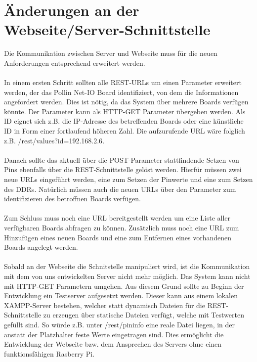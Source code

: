 \section{Änderungen an der Webseite/Server-Schnittstelle}
\label{aenderung_schnitstelle}
Die Kommunikation zwischen Server und Webseite muss für die neuen Anforderungen
entsprechend erweitert werden. \\
\\
In einem ersten Schritt sollten alle REST-URLs um einen Parameter erweitert
werden, der das Pollin Net-IO Board identifiziert, von dem die Informationen
angefordert werden. Dies ist nötig, da das System über mehrere Boards
verfügen könnte. Der Parameter kann als HTTP-GET Parameter übergeben werden. Als
ID eignet sich z.B. die IP-Adresse des betreffenden Boards oder eine künstliche 
ID in Form einer fortlaufend höheren Zahl. Die aufzurufende URL wäre folglich
z.B. \textrm{/rest/values?id=192.168.2.6}.\\
\\
Danach sollte das aktuell über die POST-Parameter stattfindende
Setzen von Pins ebenfalls über die REST-Schnittstelle gelöst werden. Hierfür
müssen zwei neue URLs eingeführt werden, eine zum Setzen der Pinwerte und eine
zum Setzen des DDRs. Natürlich müssen auch die neuen URLs über den
Parameter zum identifizieren des betroffnen Boards verfügen.\\
\\
Zum Schluss muss noch eine URL bereitgestellt werden um eine Liste aller
verfügbaren Boards abfragen zu können. Zusätzlich muss noch eine URL zum
Hinzufügen eines neuen Boards und eine zum Entfernen eines vorhandenen Boards
angelegt werden.\\
\\
Sobald an der Webseite die Schnitstelle manipuliert wird, ist die Kommunikation
mit dem von uns entwickelten Server nicht mehr möglich. Das System kann nicht
mit HTTP-GET Parametern umgehen. Aus diesem Grund sollte zu Beginn der
Entwicklung ein Testserver aufgesetzt werden. Dieser kann aus einem lokalen
XAMPP-Server bestehen, welcher statt dynamisch Dateien für die
REST-Schnittstelle zu erzeugen über statische Dateien verfügt, welche mit
Testwerten gefüllt sind. So würde z.B. unter \textrm{/rest/pininfo} eine reale
Datei liegen, in der anstatt der Platzhalter feste Werte eingetragen sind. Dies
ermöglicht die Entwicklung der Webseite bzw. dem Ansprechen des Servers ohne
einen funktionsfähigen Rasberry Pi.

